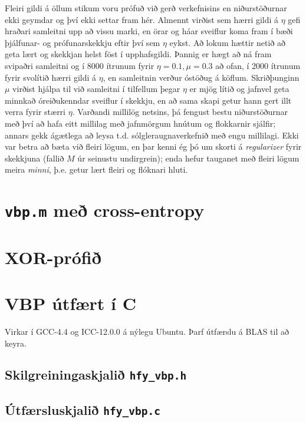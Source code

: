 \documentclass[a4paper,icelandic]{article}
\begin{document}
Fleiri gildi á öllum stikum voru prófuð við gerð verkefnisins en
niðurstöðurnar ekki geymdar og því ekki settar fram hér. Almennt virðist
sem hærri gildi á $\eta$ gefi hraðari samleitni upp að vissu marki, en
örar og háar sveiflur koma fram í bæði þjálfunar- og prófunarskekkju
eftir því sem $\eta$ eykst. Að lokum hættir netið að geta
lært og skekkjan helst föst í upphafsgildi. Þannig er hægt að ná fram
svipaðri samleitni og í 8000 ítrunum fyrir $\eta=0.1,\mu=0.3$ að ofan, í 2000  
ítrunum fyrir svolítið hærri gildi á $\eta$, en samleitnin verður
óstöðug á köflum. Skriðþunginn $\mu$ virðist hjálpa til við samleitni í
tilfellum þegar $\eta$ er mjög lítið og jafnvel geta minnkað
óreiðukenndar sveiflur í skekkju, en að sama skapi getur hann gert illt
verra fyrir stærri $\eta$. Varðandi millilög netsins, þá fengust bestu
niðurstöðurnar með því að hafa eitt millilag með jafnmörgum hnútum og
flokkarnir sjálfir; annars gekk ágætlega að leysa t.d.
sólgleraugnaverkefnið með engu millilagi. Ekki var betra að bæta við
fleiri lögum, en þar kenni ég þó um skorti á \emph{regularizer} fyrir
skekkjuna (fallið $M$ úr seinustu undirgrein); enda hefur tauganet með
fleiri lögum meira \emph{minni}, þ.e. getur lært fleiri og flóknari hluti.

\appendix


\section{\texttt{vbp.m} með cross-entropy}


\section{XOR-prófið}\label{sec:xor-test}


\section{VBP útfært í C}
Virkar í GCC-4.4 og ICC-12.0.0 á nýlegu Ubuntu. Þarf útfærslu á BLAS
\cite{blas} til
að keyra.


\subsection{Skilgreiningaskjalið \texttt{hfy\_vbp.h}}


\subsection{Útfærsluskjalið \texttt{hfy\_vbp.c}}

\end{document}
